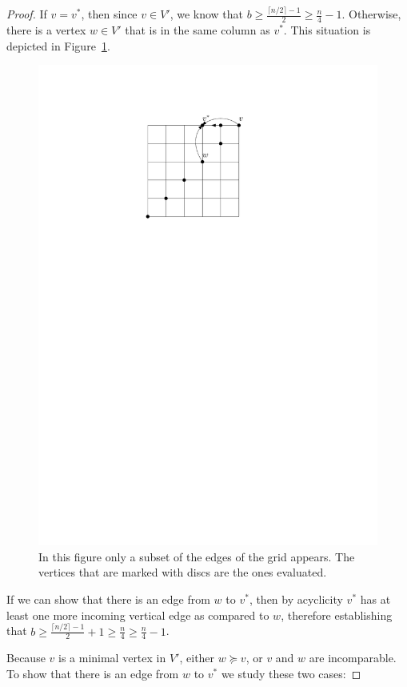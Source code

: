\documentclass[a4paper,10pt]{article}
\begin{document}
\begin{proof}
If $v = v^*$, then since $v\in V'$, we know that $b\geq \frac{\lceil n/2\rceil-1}{2}\geq \frac{n}{4} - 1$.
Otherwise, there is a vertex $w \in V'$ that is in the same column as $v^*$.
  This situation is depicted in Figure~\ref{fig:seedlem1}.
  \begin{figure}[htbp] 
  	\centering
  	\includegraphics[scale=0.7]{seedlemma_fig1.pdf}
  	\caption{In this figure only a subset of the edges of the grid appears. The vertices that are marked with discs are the ones evaluated.} 
  	\label{fig:seedlem1}
  \end{figure}
   If we can show that there is an edge from $w$ to $v^*$, then by acyclicity $v^*$ has at least one more incoming vertical edge as compared to $w$, therefore establishing that $b \geq \frac{\lceil n/2\rceil-1}{2} + 1 \geq \frac{n}{4} \geq \frac{n}{4} - 1$. 
   
   Because $v$ is a minimal vertex in $V'$, either $w\succeq v$, or $v$ and $w$ are incomparable. 
   To show that there is an edge from $w$ to $v^*$ we study these two cases: 
   

\end{proof}
\end{document}
